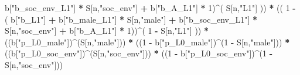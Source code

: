 \documentclass[
]{book}
\newenvironment{Shaded}{\begin{snugshade}}{\end{snugshade}}
\newcommand{\DecValTok}[1]{\textcolor[rgb]{0.00,0.00,0.81}{#1}}
\newcommand{\NormalTok}[1]{#1}
\newcommand{\SpecialCharTok}[1]{\textcolor[rgb]{0.81,0.36,0.00}{\textbf{#1}}}
\newcommand{\StringTok}[1]{\textcolor[rgb]{0.31,0.60,0.02}{#1}}
\begin{document}
\begin{Shaded}
\begin{Highlighting}[]
\NormalTok{           b[}\StringTok{"b\_soc\_env\_L1"}\NormalTok{] }\SpecialCharTok{*}\NormalTok{ S[n,}\StringTok{"soc\_env"}\NormalTok{] }\SpecialCharTok{+}
\NormalTok{           b[}\StringTok{"b\_A\_L1"}\NormalTok{] }\SpecialCharTok{*} \DecValTok{1}\NormalTok{)}\SpecialCharTok{\^{}}\NormalTok{( S[n,}\StringTok{"L1"}\NormalTok{] )) }\SpecialCharTok{*}
\NormalTok{      (( }\DecValTok{1} \SpecialCharTok{{-}}\NormalTok{ ( b[}\StringTok{"b\_L1"}\NormalTok{] }\SpecialCharTok{+}
\NormalTok{                 b[}\StringTok{"b\_male\_L1"}\NormalTok{] }\SpecialCharTok{*}\NormalTok{ S[n,}\StringTok{"male"}\NormalTok{] }\SpecialCharTok{+}  
\NormalTok{                 b[}\StringTok{"b\_soc\_env\_L1"}\NormalTok{] }\SpecialCharTok{*}\NormalTok{ S[n,}\StringTok{"soc\_env"}\NormalTok{] }\SpecialCharTok{+}
\NormalTok{                 b[}\StringTok{"b\_A\_L1"}\NormalTok{] }\SpecialCharTok{*} \DecValTok{1}\NormalTok{))}\SpecialCharTok{\^{}}\NormalTok{( }\DecValTok{1} \SpecialCharTok{{-}}\NormalTok{ S[n,}\StringTok{"L1"}\NormalTok{] )) }\SpecialCharTok{*}
\NormalTok{      ((b[}\StringTok{"p\_L0\_male"}\NormalTok{])}\SpecialCharTok{\^{}}\NormalTok{(S[n,}\StringTok{"male"}\NormalTok{])) }\SpecialCharTok{*} 
\NormalTok{      ((}\DecValTok{1} \SpecialCharTok{{-}}\NormalTok{ b[}\StringTok{"p\_L0\_male"}\NormalTok{])}\SpecialCharTok{\^{}}\NormalTok{(}\DecValTok{1} \SpecialCharTok{{-}}\NormalTok{ S[n,}\StringTok{"male"}\NormalTok{])) }\SpecialCharTok{*} 
\NormalTok{      ((b[}\StringTok{"p\_L0\_soc\_env"}\NormalTok{])}\SpecialCharTok{\^{}}\NormalTok{(S[n,}\StringTok{"soc\_env"}\NormalTok{])) }\SpecialCharTok{*}
\NormalTok{      ((}\DecValTok{1} \SpecialCharTok{{-}}\NormalTok{ b[}\StringTok{"p\_L0\_soc\_env"}\NormalTok{])}\SpecialCharTok{\^{}}\NormalTok{(}\DecValTok{1} \SpecialCharTok{{-}}\NormalTok{ S[n,}\StringTok{"soc\_env"}\NormalTok{])) }
    

\end{Highlighting}
\end{Shaded}
\end{document}
